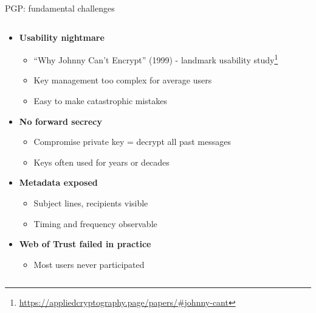\documentclass[aspectratio=169, lualatex, handout]{beamer}
\begin{document}
\begin{frame}{PGP: fundamental challenges}
	\begin{columns}[c]
		\begin{column}{1\textwidth}
			\begin{itemize}
				\item \textbf{Usability nightmare}
				      \begin{itemize}
					      \item ``Why Johnny Can't Encrypt'' (1999) - landmark usability study\footnote{\url{https://appliedcryptography.page/papers/\#johnny-cant}}
					      \item Key management too complex for average users
					      \item Easy to make catastrophic mistakes
				      \end{itemize}
				\item \textbf{No forward secrecy}
				      \begin{itemize}
					      \item Compromise private key = decrypt all past messages
					      \item Keys often used for years or decades
				      \end{itemize}
				\item \textbf{Metadata exposed}
				      \begin{itemize}
					      \item Subject lines, recipients visible
					      \item Timing and frequency observable
				      \end{itemize}
				\item \textbf{Web of Trust failed in practice}
				      \begin{itemize}
					      \item Most users never participated
				      \end{itemize}
			\end{itemize}
		\end{column}
	\end{columns}
\end{frame}
\end{document}
